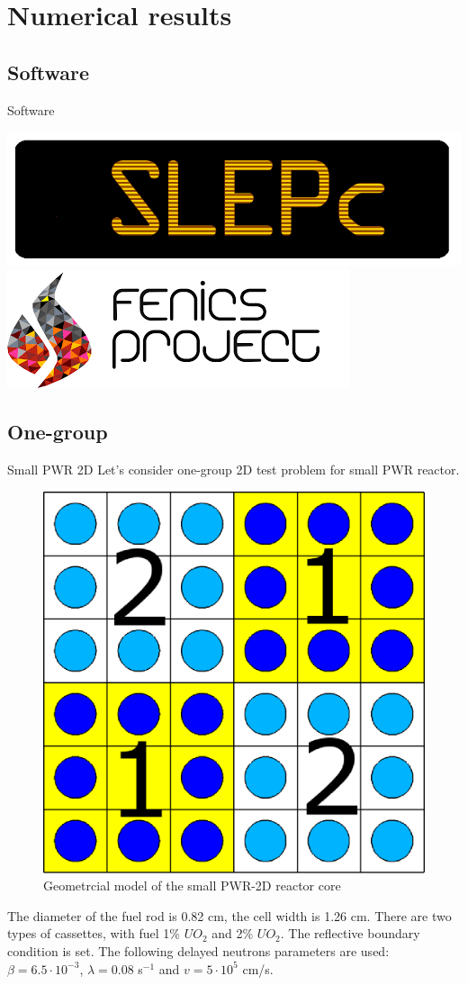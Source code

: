 \documentclass[10pt,pdf,hyperref={unicode}]{beamer}
\begin{document}
\section{Numerical results}
\subsection{Software}
	\begin{frame}{Software}
		\begin{center}
			\includegraphics[width=0.49\linewidth] {slepc.png}
			\vfill
			\includegraphics[width=0.49\linewidth] {fenics.png}
		\end{center}
\end{frame}

\subsection{One-group}
	\begin{frame}{Small PWR 2D}
		Let's consider one-group 2D test problem for small PWR reactor. 
		\begin{figure}[h]
			\centering
			\includegraphics[width=0.3\linewidth] {small/smallpwr_geo.eps}
			\caption{Geometrcial model of the small PWR-2D reactor core}
		\end{figure} 
		The diameter of the fuel rod is 0.82 cm, the cell width is 1.26 cm.
		There are two types of cassettes, with fuel 1\% $UO_2$ and 2\% $UO_2$.
		The reflective boundary condition is set.
		The following delayed neutrons parameters are used: $\beta = 6.5 \cdot 10^{-3}$, $\lambda = 0.08$ s$^{-1}$ and $v = 5 \cdot 10^5$ cm/s.
	\end{frame}
\end{document}

